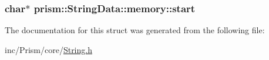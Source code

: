 \subsubsection[{\texorpdfstring{start}{start}}]{\setlength{\rightskip}{0pt plus 5cm}char$\ast$ prism\+::\+String\+Data\+::memory\+::start}\hypertarget{structprism_1_1_string_data_1_1memory_acb8564230189b60e891a5f86de755507}{}\label{structprism_1_1_string_data_1_1memory_acb8564230189b60e891a5f86de755507}


The documentation for this struct was generated from the following file\+:\begin{DoxyCompactItemize}
\item 
inc/\+Prism/core/\hyperlink{_string_8h}{String.\+h}\end{DoxyCompactItemize}
